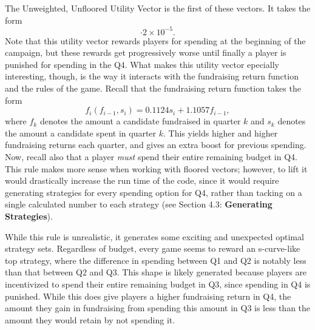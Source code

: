 \documentclass[11pt]{article}
\begin{document}
The Unweighted, Unfloored Utility Vector is the first of these vectors. It takes the form
\begin{equation}
[ 6.30872096, 2.549945091, 0.401012477, -1.653903518 ]\cdot 2\times 10^{-5}.
\end{equation}
Note that this utility vector rewards players for spending at the beginning of the campaign, but these rewards get progressively worse until finally a player is punished for spending in the Q4. What makes this utility vector epecially interesting, though, is the way it interacts with the fundraising return function and the rules of the game. Recall that the fundraising return function takes the form 
\begin{equation*}
f_i(f_{i-1}, s_i) = 0.1124s_i + 1.1057f_{i-1},
\end{equation*}
where $f_k$ denotes the amount a candidate fundraised in quarter $k$ and $s_k$ denotes the amount a  candidate spent in quarter $k$. This yields higher and higher fundraising returns each quarter, and gives an extra boost for previous spending. Now, recall also that a player \textit{must} spend their entire remaining budget in Q4. This rule makes more sense when working with floored vectors; however, to lift it would drastically increase the run time of the code, since it would require generating strategies for every spending option for Q4, rather than tacking on a single calculated number to each strategy (see Section 4.3: \textbf{Generating Strategies}).

While this rule is unrealistic, it generates some exciting and unexpected optimal strategy sets. Regardless of budget, every game seems to reward an s-curve-like top strategy, where the difference in spending between Q1 and Q2 is notably less than that between Q2 and Q3. This shape is likely generated because players are incentivized to spend their entire remaining budget in Q3, since spending in Q4 is punished. While this does give players a higher fundraising return in Q4, the amount they gain in fundraising from spending this amount in Q3 is less than the amount they would retain by not spending it. 
\end{document}
